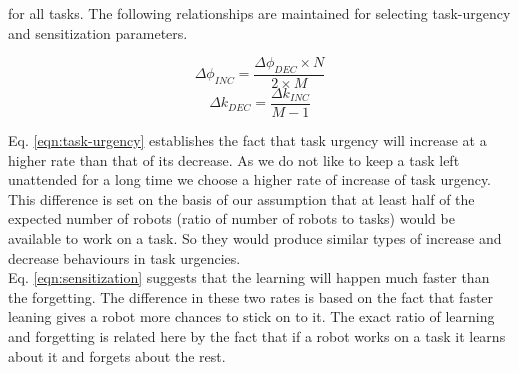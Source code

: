 \documentclass{llncs}
\begin{document}
for all tasks. The following relationships are maintained for selecting task-urgency and sensitization parameters.
\begin{small}
\begin{equation}
\Delta\phi_{INC} =  \frac{\Delta\phi_{DEC} \times N}{2 \times M}
\label{eqn:task-urgency}
\end{equation}
%
\begin{equation}
\Delta k_{DEC} = \frac{\Delta k_{INC}} {M - 1} 
\label{eqn:sensitization}
\end{equation}
\end{small}
%
Eq. \ref{eqn:task-urgency} establishes the fact that task urgency will increase at a higher rate than that of its decrease. As we do not like to keep a task left unattended for a long time we choose a higher rate of increase of task urgency. This difference is set on the basis of our assumption that at least half of the expected number of robots (ratio of number of robots to tasks) would be available to work on a task. So they would produce similar types of increase and decrease behaviours in task urgencies.\\
Eq. \ref{eqn:sensitization} suggests that the learning will happen much faster than the forgetting. The difference in these two rates is based on the fact that faster leaning gives a robot more chances to stick on to it. The exact ratio of learning and forgetting is related here by the fact that if a robot works on a task it learns about it and forgets about the rest. 
\end{document}
